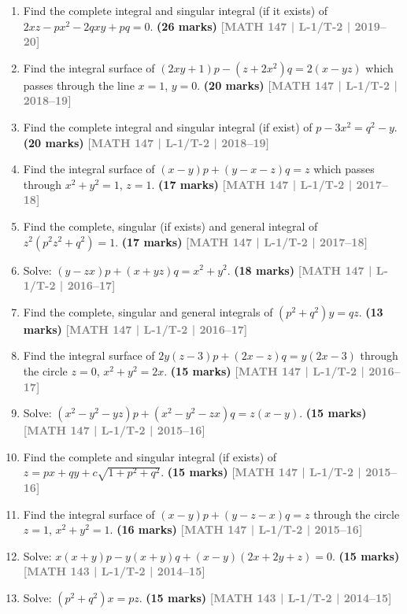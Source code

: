 \documentclass[12pt,a4paper]{article}
\newcommand{\yr}[1]{\hfill\textcolor{gray}{\small\textbf{[#1]}}}
\newcommand{\mk}[1]{\textcolor{orange!70!black}{\small\textbf{(#1 marks)}}}
\begin{document}
\begin{enumerate}
\item Find the complete integral and singular integral (if it exists) of $2xz-px^{2}-2qxy+pq=0$.
\mk{26} \yr{MATH 147 | L-1/T-2 | 2019--20}

\item Find the integral surface of $(2xy+1)p-(z+2x^{2})q=2(x-yz)$ which passes through the line $x=1$, $y=0$.
\mk{20} \yr{MATH 147 | L-1/T-2 | 2018--19}

\item Find the complete integral and singular integral (if exist) of $p-3x^{2}=q^{2}-y$.
\mk{20} \yr{MATH 147 | L-1/T-2 | 2018--19}

\item Find the integral surface of $(x-y)p+(y-x-z)q=z$ which passes through $x^{2}+y^{2}=1$, $z=1$.
\mk{17} \yr{MATH 147 | L-1/T-2 | 2017--18}

\item Find the complete, singular (if exists) and general integral of $z^{2}(p^{2}z^{2}+q^{2})=1$.
\mk{17} \yr{MATH 147 | L-1/T-2 | 2017--18}

\item Solve: $(y-zx)p+(x+yz)q=x^{2}+y^{2}$.
\mk{18} \yr{MATH 147 | L-1/T-2 | 2016--17}

\item Find the complete, singular and general integrals of $(p^{2}+q^{2})y=qz$.
\mk{13} \yr{MATH 147 | L-1/T-2 | 2016--17}

\item Find the integral surface of $2y(z-3)p+(2x-z)q=y(2x-3)$ through the circle $z=0$, $x^{2}+y^{2}=2x$.
\mk{15} \yr{MATH 147 | L-1/T-2 | 2016--17}

\item Solve: $(x^{2}-y^{2}-yz)p+(x^{2}-y^{2}-zx)q=z(x-y)$.
\mk{15} \yr{MATH 147 | L-1/T-2 | 2015--16}

\item Find the complete and singular integral (if exists) of $z=px+qy+c\sqrt{{1}+p^{2}+q^{2}}$.
\mk{15} \yr{MATH 147 | L-1/T-2 | 2015--16}

\item Find the integral surface of $(x-y)p+(y-z-x)q=z$ through the circle $z=1$, $x^{2}+y^{2}=1$.
\mk{16} \yr{MATH 147 | L-1/T-2 | 2015--16}

\item Solve: $x(x+y)p-y(x+y)q+(x-y)(2x+2y+z)=0$.
\mk{15} \yr{MATH 143 | L-1/T-2 | 2014--15}

\item Solve: $(p^{2}+q^{2})x=pz$.
\mk{15} \yr{MATH 143 | L-1/T-2 | 2014--15}


\end{enumerate}
\end{document}
